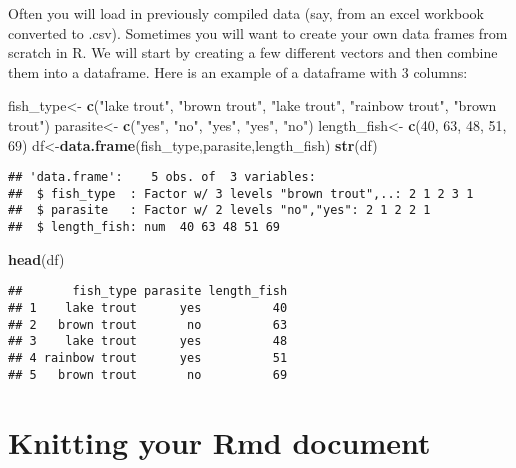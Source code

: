 \documentclass[]{article}
\newenvironment{Shaded}{\begin{snugshade}}{\end{snugshade}}
\newcommand{\DecValTok}[1]{\textcolor[rgb]{0.00,0.00,0.81}{#1}}
\newcommand{\KeywordTok}[1]{\textcolor[rgb]{0.13,0.29,0.53}{\textbf{#1}}}
\newcommand{\NormalTok}[1]{#1}
\newcommand{\StringTok}[1]{\textcolor[rgb]{0.31,0.60,0.02}{#1}}
\begin{document}
Often you will load in previously compiled data (say, from an excel
workbook converted to .csv). Sometimes you will want to create your own
data frames from scratch in R. We will start by creating a few different
vectors and then combine them into a dataframe. Here is an example of a
dataframe with 3 columns:

\begin{Shaded}
\begin{Highlighting}[]
\NormalTok{fish_type<-}\StringTok{ }\KeywordTok{c}\NormalTok{(}\StringTok{"lake trout"}\NormalTok{, }\StringTok{"brown trout"}\NormalTok{, }\StringTok{"lake trout"}\NormalTok{, }\StringTok{"rainbow trout"}\NormalTok{, }\StringTok{"brown trout"}\NormalTok{)}
\NormalTok{parasite<-}\StringTok{ }\KeywordTok{c}\NormalTok{(}\StringTok{"yes"}\NormalTok{, }\StringTok{"no"}\NormalTok{, }\StringTok{"yes"}\NormalTok{, }\StringTok{"yes"}\NormalTok{, }\StringTok{"no"}\NormalTok{)}
\NormalTok{length_fish<-}\StringTok{ }\KeywordTok{c}\NormalTok{(}\DecValTok{40}\NormalTok{, }\DecValTok{63}\NormalTok{, }\DecValTok{48}\NormalTok{, }\DecValTok{51}\NormalTok{, }\DecValTok{69}\NormalTok{)}
\NormalTok{df<-}\KeywordTok{data.frame}\NormalTok{(fish_type,parasite,length_fish)}
\KeywordTok{str}\NormalTok{(df)}
\end{Highlighting}
\end{Shaded}

\begin{verbatim}
## 'data.frame':    5 obs. of  3 variables:
##  $ fish_type  : Factor w/ 3 levels "brown trout",..: 2 1 2 3 1
##  $ parasite   : Factor w/ 2 levels "no","yes": 2 1 2 2 1
##  $ length_fish: num  40 63 48 51 69
\end{verbatim}

\begin{Shaded}
\begin{Highlighting}[]
\KeywordTok{head}\NormalTok{(df)}
\end{Highlighting}
\end{Shaded}

\begin{verbatim}
##       fish_type parasite length_fish
## 1    lake trout      yes          40
## 2   brown trout       no          63
## 3    lake trout      yes          48
## 4 rainbow trout      yes          51
## 5   brown trout       no          69
\end{verbatim}

\hypertarget{knitting-your-rmd-document}{%
\section{Knitting your Rmd document}\label{knitting-your-rmd-document}}
\end{document}

